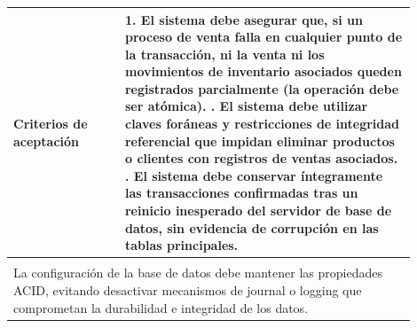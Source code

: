 \begin{longtable}{|p{0.25\linewidth}|p{0.15\linewidth}|p{0.15\linewidth}|p{0.35\linewidth}|}
		\cellcolor{tableheaderblue}\textbf{Criterios de aceptación} & \multicolumn{3}{p{0.70\linewidth}|}{                                                                                                                                 %
			1. El sistema debe asegurar que, si un proceso de venta falla en cualquier punto de la transacción, ni la venta ni los movimientos de inventario asociados queden registrados parcialmente (la operación debe ser atómica). \newline
			2. El sistema debe utilizar claves foráneas y restricciones de integridad referencial que impidan eliminar productos o clientes con registros de ventas asociados. \newline
		3. El sistema debe conservar íntegramente las transacciones confirmadas tras un reinicio inesperado del servidor de base de datos, sin evidencia de corrupción en las tablas principales.}                                         \\ \hline
		\rowcolor{tableheaderblue}
		\multicolumn{4}{|l|}{\textbf{Restricciones}}                                                                                                                                                                                       \\ \hline
		\multicolumn{4}{|p{0.96\linewidth}|}{%
		La configuración de la base de datos debe mantener las propiedades ACID, evitando desactivar mecanismos de journal o logging que comprometan la durabilidad e integridad de los datos.}                                            \\ \hline
	
\end{longtable}
\endgroup


